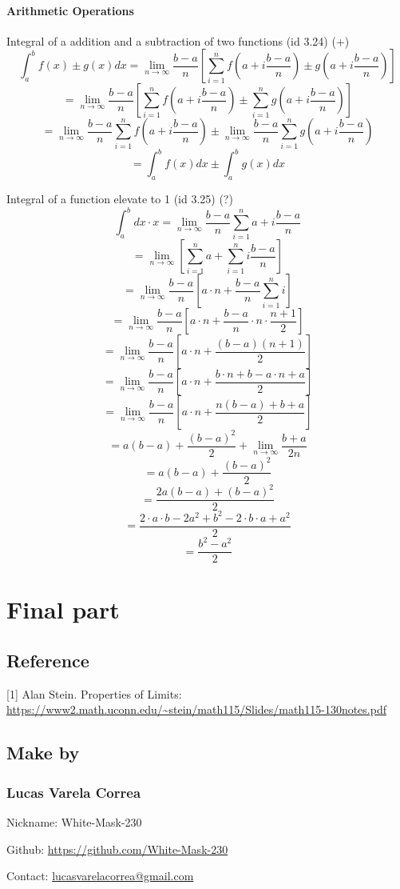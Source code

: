 \documentclass{book}
\begin{document}
                \subsubsection{Arithmetic Operations}
                    Integral of a addition and a subtraction of two functions (id 3.24) (+)
                    \[\int^b_a f(x) \pm g(x) dx = \lim_{n \rightarrow \infty} \frac{b - a}{n} \left[ \sum^n_{i=1} f\left(a + i \frac{b - a}{n}\right) \pm g\left(a + i \frac{b - a}{n} \right) \right]\]
                    \[= \lim_{n \rightarrow \infty} \frac{b - a}{n} \left[\sum^n_{i=1} f\left(a + i \frac{b - a}{n} \right) \pm \sum^n_{i=1} g\left(a + i \frac{b - a}{n}\right) \right]\]
                    \[= \lim_{n \rightarrow \infty} \frac{b - a}{n} \sum^n_{i = 1} f\left(a + i \frac{b - a}{n}\right) \pm \lim_{n \rightarrow \infty} \frac{b - a}{n} \sum^n_{i=1} g\left(a + i \frac{b - a}{n}\right)\]
                    \[= \int^b_a f(x) dx \pm \int^b_a g(x) dx\]

                    Integral of a function elevate to 1 (id 3.25) (?)
                    \[\int^b_a dx \cdot x = \lim_{n \rightarrow \infty} \frac{b - a}{n} \sum^n_{i=1} a + i \frac{b - a}{n}\]
                    \[= \lim_{n \rightarrow \infty} \left[\sum^n_{i=1} a + \sum^n_{i=1} i \frac{b - a}{n}\right]\]
                    \[= \lim_{n \rightarrow \infty} \frac{b - a}{n} \left[a \cdot n + \frac{b - a}{n} \sum^n_{i=1} i \right]\]
                    \[= \lim_{n \rightarrow \infty} \frac{b - a}{n} \left[a \cdot n + \frac{b - a}{n} \cdot n \cdot \frac{n + 1}{2}\right]\]
                    \[= \lim_{n \rightarrow \infty} \frac{b - a}{n} \left[a \cdot n + \frac{(b - a)(n + 1)}{2}\right]\]
                    \[= \lim_{n \rightarrow \infty} \frac{b - a}{n} \left[a \cdot n + \frac{b \cdot n + b - a \cdot n + a}{2}\right]\]
                    \[= \lim_{n \rightarrow \infty} \frac{b - a}{n} \left[a \cdot n + \frac{n (b - a) + b + a}{2}\right]\]
                    \[= a(b - a) + \frac{(b - a)^2}{2} + \lim_{n \rightarrow \infty} \frac{b + a}{2 n}\]
                    \[= a(b - a) + \frac{(b - a)^2}{2}\]
                    \[= \frac{2a(b - a) + (b - a)^2}{2}\]
                    \[= \frac{2 \cdot a \cdot b - 2a^2 + b^2 - 2 \cdot b \cdot a + a^2}{2}\]
                    \[= \frac{b^2 - a^2}{2}\]

        \chapter{Final part}
            \section{Reference}
                [1] Alan Stein. Properties of Limits: \url{https://www2.math.uconn.edu/~stein/math115/Slides/math115-130notes.pdf}

            \section{Make by}
                \subsection*{Lucas Varela Correa}
                    Nickname: White-Mask-230
                    
                    Github: \url{https://github.com/White-Mask-230}

                    Contact: \url{lucasvarelacorrea@gmail.com}
\end{document}
